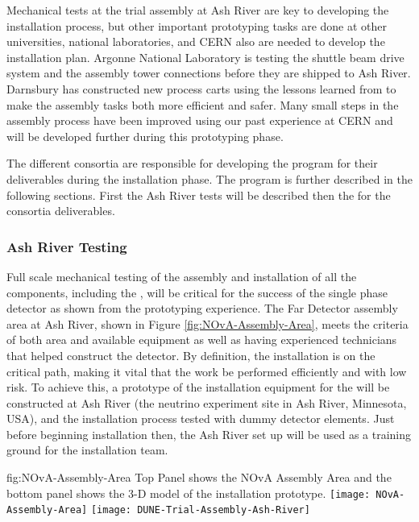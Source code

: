 Mechanical tests at the  trial assembly at Ash River are key to developing the installation process, but other important prototyping tasks are done at other universities, national laboratories, and CERN also are needed to develop the installation plan. Argonne National Laboratory is testing the  shuttle beam drive system and the  assembly tower connections before they are shipped to Ash River.  
Darnsbury has constructed new process carts using the lessons learned from  to make the assembly tasks both more efficient and safer. 
Many small steps in the assembly process have been improved using our past experience at CERN and will be developed further during this prototyping phase. 

The different consortia are responsible for developing the  program for their deliverables during the installation phase. 
The program is further described in the following  sections. First the Ash River tests will be described then the  for the consortia deliverables.

\subsubsection{Ash River Testing}

Full scale mechanical testing of the assembly and installation of all the  components, including the , will be critical for the success of the single phase detector as shown from the  prototyping experience. 
The \nova Far Detector assembly area at Ash River, shown in Figure \ref{fig:NOvA-Assembly-Area}, meets the criteria of both area and available equipment as well as having experienced technicians that helped construct the  detector. 
By definition, the installation  is on the critical path, making it vital that the work be performed efficiently and with low risk. 
To achieve this, a prototype of the installation
equipment for the   will be constructed at Ash River (the \nova neutrino experiment  site in Ash River, Minnesota, USA), and the installation process tested with dummy detector elements.  
Just before beginning installation then, the Ash River set up will be used as a training ground for the installation team. 

\begin{dunefigure}
{fig:NOvA-Assembly-Area}
{Top Panel shows the NOvA Assembly Area and the bottom panel shows the 3-D model of the installation prototype.}                
\texttt{[image: NOvA-Assembly-Area]}
\vspace{-12pt}
\texttt{[image: DUNE-Trial-Assembly-Ash-River]}
\end{dunefigure}




